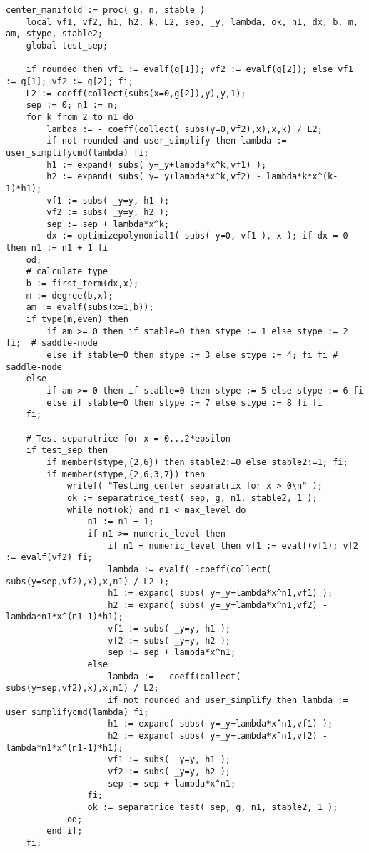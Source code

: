\documentclass[a4paper,10pt]{article}
\begin{document}
\begin{lstlisting}[name=type]
center_manifold := proc( g, n, stable )
    local vf1, vf2, h1, h2, k, L2, sep, _y, lambda, ok, n1, dx, b, m, am, stype, stable2;
    global test_sep;

    if rounded then vf1 := evalf(g[1]); vf2 := evalf(g[2]); else vf1 := g[1]; vf2 := g[2]; fi;
    L2 := coeff(collect(subs(x=0,g[2]),y),y,1);
    sep := 0; n1 := n;
    for k from 2 to n1 do
        lambda := - coeff(collect( subs(y=0,vf2),x),x,k) / L2;
        if not rounded and user_simplify then lambda := user_simplifycmd(lambda) fi;
        h1 := expand( subs( y=_y+lambda*x^k,vf1) );
        h2 := expand( subs( y=_y+lambda*x^k,vf2) - lambda*k*x^(k-1)*h1);
        vf1 := subs( _y=y, h1 );
        vf2 := subs( _y=y, h2 );
        sep := sep + lambda*x^k;
        dx := optimizepolynomial1( subs( y=0, vf1 ), x ); if dx = 0 then n1 := n1 + 1 fi
    od;
    # calculate type
    b := first_term(dx,x);
    m := degree(b,x);
    am := evalf(subs(x=1,b));
    if type(m,even) then
        if am >= 0 then if stable=0 then stype := 1 else stype := 2 fi;  # saddle-node
        else if stable=0 then stype := 3 else stype := 4; fi fi # saddle-node
    else
        if am >= 0 then if stable=0 then stype := 5 else stype := 6 fi
        else if stable=0 then stype := 7 else stype := 8 fi fi
    fi;

    # Test separatrice for x = 0...2*epsilon
    if test_sep then
        if member(stype,{2,6}) then stable2:=0 else stable2:=1; fi;
        if member(stype,{2,6,3,7}) then
            writef( "Testing center separatrix for x > 0\n" );
            ok := separatrice_test( sep, g, n1, stable2, 1 );
            while not(ok) and n1 < max_level do
                n1 := n1 + 1;
                if n1 >= numeric_level then
                    if n1 = numeric_level then vf1 := evalf(vf1); vf2 := evalf(vf2) fi;
                    lambda := evalf( -coeff(collect( subs(y=sep,vf2),x),x,n1) / L2 );
                    h1 := expand( subs( y=_y+lambda*x^n1,vf1) );
                    h2 := expand( subs( y=_y+lambda*x^n1,vf2) - lambda*n1*x^(n1-1)*h1);
                    vf1 := subs( _y=y, h1 );
                    vf2 := subs( _y=y, h2 );
                    sep := sep + lambda*x^n1;
                else
                    lambda := - coeff(collect( subs(y=sep,vf2),x),x,n1) / L2;
                    if not rounded and user_simplify then lambda := user_simplifycmd(lambda) fi;
                    h1 := expand( subs( y=_y+lambda*x^n1,vf1) );
                    h2 := expand( subs( y=_y+lambda*x^n1,vf2) - lambda*n1*x^(n1-1)*h1);
                    vf1 := subs( _y=y, h1 );
                    vf2 := subs( _y=y, h2 );
                    sep := sep + lambda*x^n1;
                fi;
                ok := separatrice_test( sep, g, n1, stable2, 1 );
            od;
        end if;
    fi;


\end{lstlisting}
\end{document}
